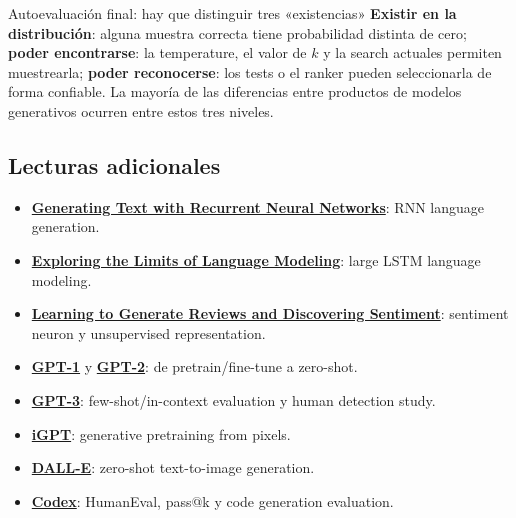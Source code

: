 \documentclass[a4paper]{article}
\begin{document}
\begin{knowledgebox}{Autoevaluación final: hay que distinguir tres «existencias»}
\textbf{Existir en la distribución}: alguna muestra correcta tiene probabilidad distinta de cero; \textbf{poder encontrarse}: la temperature, el valor de $k$ y la search actuales permiten muestrearla; \textbf{poder reconocerse}: los tests o el ranker pueden seleccionarla de forma confiable. La mayoría de las diferencias entre productos de modelos generativos ocurren entre estos tres niveles.
\end{knowledgebox}

\subsection{Lecturas adicionales}

{\small
\begin{itemize}[nosep,leftmargin=*]
  \item \href{https://www.cs.utoronto.ca/~ilya/pubs/2011/LANG-RNN.pdf}{\textbf{Generating Text with Recurrent Neural Networks}}: RNN language generation.
  \item \href{https://arxiv.org/abs/1602.02410}{\textbf{Exploring the Limits of Language Modeling}}: large LSTM language modeling.
  \item \href{https://arxiv.org/abs/1704.01444}{\textbf{Learning to Generate Reviews and Discovering Sentiment}}: sentiment neuron y unsupervised representation.
  \item \href{https://cdn.openai.com/research-covers/language-unsupervised/language_understanding_paper.pdf}{\textbf{GPT-1}} y \href{https://cdn.openai.com/better-language-models/language_models_are_unsupervised_multitask_learners.pdf}{\textbf{GPT-2}}: de pretrain/fine-tune a zero-shot.
  \item \href{https://arxiv.org/abs/2005.14165}{\textbf{GPT-3}}: few-shot/in-context evaluation y human detection study.
  \item \href{https://arxiv.org/abs/2006.10738}{\textbf{iGPT}}: generative pretraining from pixels.
  \item \href{https://arxiv.org/abs/2102.12092}{\textbf{DALL-E}}: zero-shot text-to-image generation.
  \item \href{https://arxiv.org/abs/2107.03374}{\textbf{Codex}}: HumanEval, pass@k y code generation evaluation.
\end{itemize}
}
\end{document}

